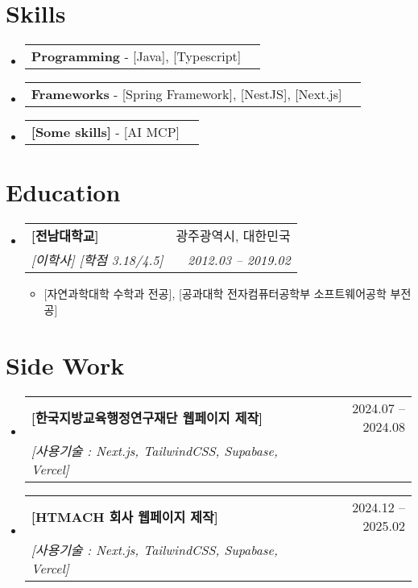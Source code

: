 \documentclass[letterpaper,11pt]{article}
\makeatletter
\newcommand{\resumeItem}[1]{
  \item\small{
    {#1 \vspace{-2pt}}
  }
}
\newcommand{\resumeSubheading}[4]{
  \vspace{-1pt}\item
    \begin{tabular*}{0.97\textwidth}[t]{l@{\extracolsep{\fill}}r}
      \textbf{#1} & #2 \\
      \textit{\small#3} & \textit{\small #4} \\
    \end{tabular*}\vspace{-5pt}
}
\newcommand{\resumeSkills}[1]{
  \item
    \begin{tabular*}{0.97\textwidth}[t]{l@{\extracolsep{\fill}}r}
      #1
    \end{tabular*}
}
\newcommand{\resumeCommunity}[3]{
  \vspace{-1pt}\item
    \begin{tabular*}{0.97\textwidth}[t]{l@{\extracolsep{\fill}}r}
      \textbf{#1} & #2 \\
      \textit{\small#3} \\
    \end{tabular*}\vspace{-5pt}
}
\newcommand{\resumeSubHeadingListStart}{\begin{itemize}[leftmargin=*]}
\newcommand{\resumeSubHeadingListEnd}{\end{itemize}}
\newcommand{\resumeItemListStart}{\begin{itemize}}
\newcommand{\resumeItemListEnd}{\end{itemize}\vspace{-5pt}}
\makeatother
\begin{document}

\section{Skills}
  \resumeSubHeadingListStart
    \resumeSkills{\textbf{Programming} - [Java], [Typescript]}
    \resumeSkills{\textbf{Frameworks} - [Spring Framework], [NestJS], [Next.js]}
    \resumeSkills{\textbf{[Some skills]} - [AI MCP]}
  \resumeSubHeadingListEnd

\section{Education}
  \resumeSubHeadingListStart
    \resumeSubheading
      {[전남대학교]}{광주광역시, 대한민국}
      {[이학사] [학점 3.18/4.5]}{2012.03 -- 2019.02}
      \resumeItemListStart
          \resumeItem{[자연과학대학 수학과 전공], [공과대학 전자컴퓨터공학부 소프트웨어공학 부전공]}
      \resumeItemListEnd

  \resumeSubHeadingListEnd

\section{Side Work}
    \resumeSubHeadingListStart
        \resumeCommunity{[한국지방교육행정연구재단 웹페이지 제작]}{2024.07 -- 2024.08}
        {[사용기술 : Next.js, TailwindCSS, Supabase, Vercel]}
        
        \resumeCommunity{[HTMACH 회사 웹페이지 제작]}{2024.12 -- 2025.02}
        {[사용기술 : Next.js, TailwindCSS, Supabase, Vercel]}

    \resumeSubHeadingListEnd

\end{document}
